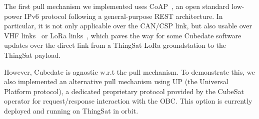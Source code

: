 The first pull mechanism we implemented uses CoAP~\cite{rfc7252}, an open standard
low-power IPv6 protocol following a general-purpose REST architecture. In particular,
it is not only applicable over the CAN/CSP link, but also usable over VHF links~\cite{palma2018vhf-coap}
or LoRa links~\cite{sanchez2018lora-coap}, which paves the way for some Cubedate
software updates over the direct link from a ThingSat LoRa groundstation to the ThingSat payload.

However, Cubedate is agnostic w.r.t the pull mechanism. To demonstrate this, we
also implemented an alternative pull mechanism using UP (the Universal Platform protocol),
a dedicated proprietary protocol provided by the CubeSat operator for request/response
interaction with the OBC. This option is currently deployed and running on ThingSat in orbit.
